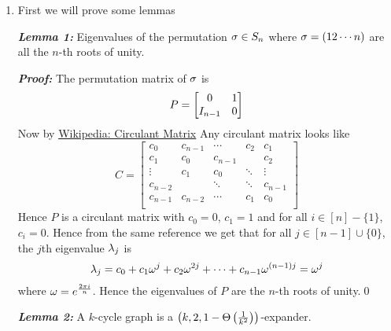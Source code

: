 \documentclass[a4paper, 11pt]{article}
\begin{document}
{\begin{enumerate}
	Now\begin{align*}
		1-[p(\lm_1+\lm_2+\lm_2^2)+(1-p)] & = 1-(1-p)-p(\lm_1+\lm_2+\lm_2^2)\\
		& =p-p(\lm_1+\lm_2+\lm_2^2)\\
		& =p[1-(\lm_1+\lm_2+\lm_2^2)]
	\end{align*}Now we know $$\lm_1+\lm_2+\lm_2^2<1\iff 0<1-(\lm_1+\lm_2+\lm_2^2)<1\qquad \text{and}\qquad 0<p<1$$Then $0<p[1-(\lm_1+\lm_2+\lm_2^2)]<1$. Hence $$0<p(\lm_1+\lm_2+\lm_2^2)+(1-p)<1$$ Now 
	\begin{align*}
		1-g(\gm_1,\gm_2,D_2) & =\lt[p(\lm_1+\lm_2+\lm_2^2)+(1-p)\rt]^{\frac13}    \\
		                     & = \lt[1- p[1-(\lm_1+\lm_2+\lm_2^2)] \rt]^{\frac13} \\
		                     & \leq 1-\frac13 p[1-(\lm_1+\lm_2+\lm_2^2)]<1
	\end{align*}So $$g(\gm_1,\gm_2,D_2)=1-	\lt[p(\lm_1+\lm_2+\lm_2^2)+(1-p)\rt]^{\frac13} >0$$
	\item First we will prove some  lemmas
	
	\textbf{\textit{Lemma 1:}} Eigenvalues of the permutation $\sigma\in S_n$ where $\sigma=(12\cdots n)$ are all the $n$-th roots of unity.
	
	\textbf{\textit{Proof:}} The permutation matrix of $\sigma$ is $$P=\left[\begin{matrix}0& 1\\ I_{n-1} & 0\end{matrix}\right]$$
	Now by \href{https://en.wikipedia.org/wiki/Circulant_matrix}{Wikipedia: Circulant Matrix} Any circulant matrix looks like $${\displaystyle C={\begin{bmatrix}c_{0}&c_{n-1}&\cdots &c_{2}&c_{1}\\c_{1}&c_{0}&c_{n-1}&&c_{2}\\\vdots &c_{1}&c_{0}&\ddots &\vdots \\c_{n-2}&&\ddots &\ddots &c_{n-1}\\c_{n-1}&c_{n-2}&\cdots &c_{1}&c_{0}\\\end{bmatrix}}}$$Hence $P$ is a circulant matrix with $c_0=0$, $c_1=1$ and for all $i\in [n]-\{1\}$, $c_i=0$. Hence from the same reference we get that for all $j\in [n-1]\cup \{0\}$, the  $j$th eigenvalue $\lambda_j$ is $${\displaystyle \lambda _{j}=c_{0}+c_{1}\omega ^{j}+c_{2}\omega ^{2j}+\dots +c_{n-1}\omega ^{(n-1)j}}=\omega^j$$ where $\omega=e^{\frac{2\pi i}{n}}$. Hence the eigenvalues of $P$ are the $n$-th roots of unity.\qed
	
	\textbf{\textit{Lemma 2:}} A $k$-cycle graph is a $\left(k,2,1-\Theta\left(\frac1{k^2}\right)\right)$-expander.
	

\end{enumerate}}
\end{document}
